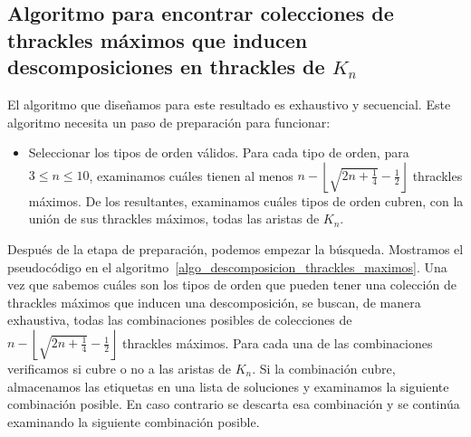 \subsection{Algoritmo para encontrar colecciones de thrackles máximos que
inducen descomposiciones en thrackles de $K_n$}\label{secc:algo_descomposicion_thrackles_maximos}
  El algoritmo que diseñamos para este resultado es exhaustivo y secuencial.
  Este algoritmo necesita un paso de preparación para funcionar:
  \begin{itemize}
    \item Seleccionar los tipos de orden válidos. Para cada tipo de orden, para $3\leq n \leq 10$,
    examinamos cuáles tienen al menos $n - \left\lfloor\sqrt{2n + \frac{1}{4}} -
    \frac{1}{2}\right\rfloor$ thrackles máximos. De los resultantes, examinamos cuáles tipos de
    orden cubren, con la unión de sus thrackles máximos, todas las aristas de $K_n$.
  \end{itemize}
  Después de la etapa de preparación, podemos empezar la búsqueda. Mostramos el pseudocódigo en el
  algoritmo~\ref{algo_descomposicion_thrackles_maximos}. Una vez que sabemos cuáles son los tipos
  de orden que pueden tener una colección de thrackles  máximos que inducen una descomposición,  se
  buscan, de manera exhaustiva, todas las combinaciones posibles de colecciones de $n -
  \left\lfloor\sqrt{2n + \frac{1}{4}} - \frac{1}{2}\right\rfloor$ thrackles máximos. Para cada una
  de las combinaciones verificamos si cubre o no a las aristas de $K_n$. Si la combinación cubre,
  almacenamos las etiquetas en una lista de soluciones y examinamos la siguiente combinación
  posible. En caso contrario se descarta esa combinación y se continúa examinando la siguiente
  combinación posible.

